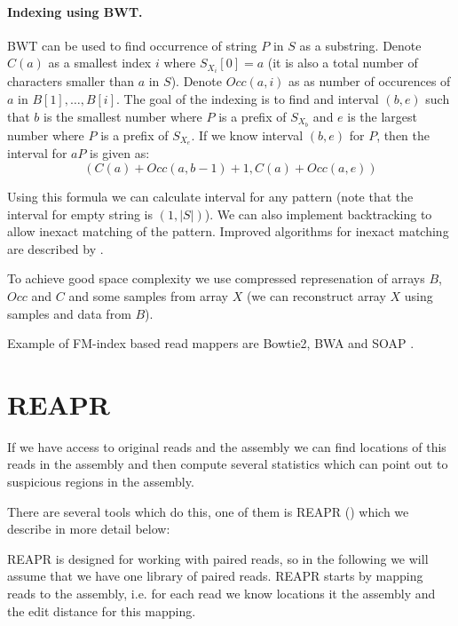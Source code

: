 \paragraph{Indexing using BWT.}
BWT can be used to find occurrence of string $P$ in $S$ as a substring.
Denote $C(a)$ as a smallest index $i$ where $S_{X_i}[0] = a$ (it is also
a total number of characters smaller than $a$ in $S$).
Denote $Occ(a,i)$ as as number of occurences of $a$ in $B[1], \dots, B[i]$.
The goal of the indexing is to find and interval $(b, e)$ such that
$b$ is the smallest number where $P$ is a prefix of $S_{X_b}$
and $e$ is the largest number where $P$ is a prefix of $S_{X_e}$.
If we know interval $(b, e)$ for $P$, then the interval for
$aP$ is given as:
$$(C(a) + Occ(a, b - 1) + 1, C(a) + Occ(a, e))$$

Using this formula we can calculate interval for any pattern (note that
the interval for empty string is $(1, |S|)$). We can also implement
backtracking to allow inexact matching of the pattern. 
Improved algorithms for inexact matching are described by \citet{fmindex3}.

To achieve good space complexity we use compressed represenation
of arrays $B$, $Occ$ and $C$ and some samples from array $X$ (we can reconstruct
array $X$ using samples and data from $B$).

Example of FM-index based read mappers are Bowtie2, BWA and SOAP
\citep{bowtie2,fmindex,soap}.

\section{REAPR}

If we have access to original reads and the assembly we can find locations
of this reads in the assembly and then compute several statistics which
can point out to suspicious regions in the assembly.

There are several tools which do this, one of them is REAPR (\cite{Reapr}) which we describe
in more detail below:

REAPR is designed for working with paired reads, so in the following we will assume that
we have one library of paired reads. REAPR starts by mapping reads to the assembly, i.e. for each read we know locations it the assembly
and the edit distance for this mapping.

